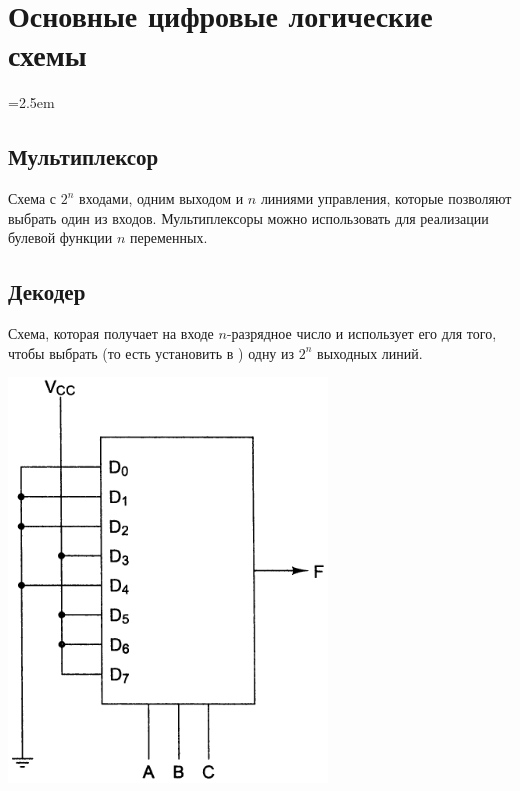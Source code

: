
\chapter{Основные цифровые логические схемы}

\noindent
\begin{minipage}[c]{0.65\textwidth}
\parindent=2.5em

\section{Мультиплексор}
Схема с \(2^n\) входами, одним выходом и \(n\) линиями управления, которые позволяют выбрать один из входов. Мультиплексоры можно использовать для реализации булевой функции \(n\) переменных.



\section{Декодер}
Схема, которая получает на входе \(n\)-разрядное число и использует его для того, чтобы выбрать (то есть установить в ) одну из \(2^n\) выходных линий.

\end{minipage}\hfill\begin{minipage}{0.3\textwidth}

\vspace{-2em}
\includegraphics[width=\textwidth]{images/multiplexer.png}


\end{minipage}
